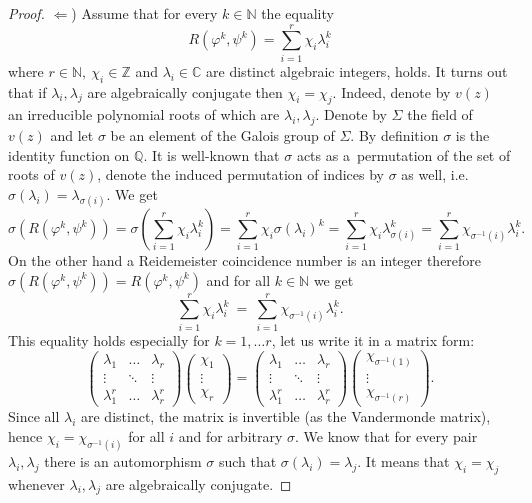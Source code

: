 \documentclass[12pt, a4paper]{amsart}
\def\C{{\mathbb C}}
\def\Z{{\mathbb Z}}
\def\Q{{\mathbb Q}}
\def\N{{\mathbb N}}
\begin{document}
\begin{proof}
  $\Leftarrow$)
  Assume that for every $k \in \N$ the equality $$R(\varphi^k, \psi^k) = \sum_{i=1}^{r} \chi_i \lambda_i^k$$
  where $r \in \N, \ \chi_i \in \Z$ and $\lambda_i \in \C$ are distinct algebraic integers, holds.
  It turns out that if $\lambda_i, \lambda_j$ are algebraically conjugate then $\chi_i = \chi_j$.
  Indeed, denote by $v(z)$ an irreducible polynomial roots of which are $\lambda_i, \lambda_j$.
  Denote by $\Sigma$ the field of $v(z)$ and let $\sigma$ be an element of the Galois group of $\Sigma$.
  By definition $\sigma$ is the identity function on $\Q$.
  It is well-known that $\sigma$ acts as a~permutation of the set of roots of $v(z)$,
  denote the induced permutation of indices by $\sigma$ as well,
  i.e. $\sigma(\lambda_i) = \lambda_{\sigma(i)}$.
  We get
  \[
    \sigma \left( R(\varphi^k, \psi^k) \right)
    = \sigma \left( \sum_{i=1}^r \chi_i \lambda_i^k \right)
    = \sum_{i=1}^r \chi_i \sigma(\lambda_i)^k
    = \sum_{i=1}^r \chi_i \lambda_{\sigma(i)}^k
    = \sum_{i=1}^r \chi_{\sigma^{-1}(i)} \lambda_i^k.
  \]
  On the other hand a Reidemeister coincidence number is an integer
  therefore $\sigma \left( R(\varphi^k, \psi^k) \right) = R(\varphi^k, \psi^k)$
  and for all $k \in \N$ we get
  \[
    \sum_{i=1}^r \chi_i \lambda_i^k \ = \ \sum_{i=1}^r \chi_{\sigma^{-1}(i)} \lambda_i^k.
  \]
  This equality holds especially for $k = 1, \dots r$, let us write it in a matrix form:
  \[
    \begin{pmatrix}
        \lambda_1   & \dots  & \lambda_r \\
        \vdots      & \ddots & \vdots    \\
        \lambda_1^r & \dots  & \lambda_r^r
    \end{pmatrix}
    \begin{pmatrix}
        \chi_1 \\ \vdots \\ \chi_r
    \end{pmatrix}
    =
    \begin{pmatrix}
        \lambda_1   & \dots  & \lambda_r \\
        \vdots      & \ddots & \vdots    \\
        \lambda_1^r & \dots  & \lambda_r^r
    \end{pmatrix}
    \begin{pmatrix}
        \chi_{\sigma^{-1}(1)} \\ \vdots \\ \chi_{\sigma^{-1}(r)}
    \end{pmatrix}.
  \]
  Since all $\lambda_i$ are distinct, the matrix is invertible (as the Vandermonde matrix),
  hence $\chi_i = \chi_{\sigma^{-1}(i)}$ for all $i$ and for arbitrary $\sigma$.
  We know that for every pair $\lambda_i, \lambda_j$ there is an automorphism $\sigma$
  such that  $\sigma(\lambda_i) = \lambda_j$.
  It means that $\chi_i = \chi_j$ whenever $\lambda_i, \lambda_j$ are algebraically conjugate.


\end{proof}
\end{document}
